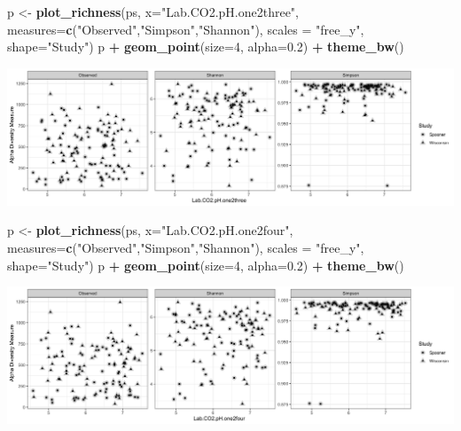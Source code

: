 \documentclass[]{article}
\newenvironment{Shaded}{\begin{snugshade}}{\end{snugshade}}
\newcommand{\DataTypeTok}[1]{\textcolor[rgb]{0.13,0.29,0.53}{#1}}
\newcommand{\DecValTok}[1]{\textcolor[rgb]{0.00,0.00,0.81}{#1}}
\newcommand{\FloatTok}[1]{\textcolor[rgb]{0.00,0.00,0.81}{#1}}
\newcommand{\KeywordTok}[1]{\textcolor[rgb]{0.13,0.29,0.53}{\textbf{#1}}}
\newcommand{\NormalTok}[1]{#1}
\newcommand{\OperatorTok}[1]{\textcolor[rgb]{0.81,0.36,0.00}{\textbf{#1}}}
\newcommand{\StringTok}[1]{\textcolor[rgb]{0.31,0.60,0.02}{#1}}
\begin{document}
\begin{Shaded}
\begin{Highlighting}[]
\NormalTok{p <-}\StringTok{ }\KeywordTok{plot_richness}\NormalTok{(ps, }\DataTypeTok{x=}\StringTok{"Lab.CO2.pH.one2three"}\NormalTok{, }\DataTypeTok{measures=}\KeywordTok{c}\NormalTok{(}\StringTok{"Observed"}\NormalTok{,}\StringTok{"Simpson"}\NormalTok{,}\StringTok{"Shannon"}\NormalTok{), }\DataTypeTok{scales =} \StringTok{"free_y"}\NormalTok{, }\DataTypeTok{shape=}\StringTok{"Study"}\NormalTok{)}
\NormalTok{p }\OperatorTok{+}\StringTok{ }\KeywordTok{geom_point}\NormalTok{(}\DataTypeTok{size=}\DecValTok{4}\NormalTok{, }\DataTypeTok{alpha=}\FloatTok{0.2}\NormalTok{) }\OperatorTok{+}\StringTok{ }\KeywordTok{theme_bw}\NormalTok{()}
\end{Highlighting}
\end{Shaded}

\includegraphics{output-rmd/richness-ph-Lab.CO2.pH.one2three-1.png}

\begin{Shaded}
\begin{Highlighting}[]
\NormalTok{p <-}\StringTok{ }\KeywordTok{plot_richness}\NormalTok{(ps, }\DataTypeTok{x=}\StringTok{"Lab.CO2.pH.one2four"}\NormalTok{, }\DataTypeTok{measures=}\KeywordTok{c}\NormalTok{(}\StringTok{"Observed"}\NormalTok{,}\StringTok{"Simpson"}\NormalTok{,}\StringTok{"Shannon"}\NormalTok{), }\DataTypeTok{scales =} \StringTok{"free_y"}\NormalTok{, }\DataTypeTok{shape=}\StringTok{"Study"}\NormalTok{)}
\NormalTok{p }\OperatorTok{+}\StringTok{ }\KeywordTok{geom_point}\NormalTok{(}\DataTypeTok{size=}\DecValTok{4}\NormalTok{, }\DataTypeTok{alpha=}\FloatTok{0.2}\NormalTok{) }\OperatorTok{+}\StringTok{ }\KeywordTok{theme_bw}\NormalTok{()}
\end{Highlighting}
\end{Shaded}

\includegraphics{output-rmd/richness-ph-Lab.CO2.pH.one2four-1.png}
\end{document}
